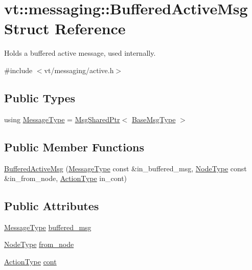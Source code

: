 \hypertarget{structvt_1_1messaging_1_1_buffered_active_msg}{}\section{vt\+:\+:messaging\+:\+:Buffered\+Active\+Msg Struct Reference}
\label{structvt_1_1messaging_1_1_buffered_active_msg}


Holds a buffered active message, used internally.  




{\ttfamily \#include $<$vt/messaging/active.\+h$>$}

\subsection*{Public Types}
\begin{DoxyCompactItemize}
\item 
using \hyperlink{structvt_1_1messaging_1_1_buffered_active_msg_a36c6d58d477907e916a251fb358f9154}{Message\+Type} = \hyperlink{structvt_1_1messaging_1_1_msg_shared_ptr}{Msg\+Shared\+Ptr}$<$ \hyperlink{namespacevt_a44d0d4e144748f2b19a1cfd962f50338}{Base\+Msg\+Type} $>$
\end{DoxyCompactItemize}
\subsection*{Public Member Functions}
\begin{DoxyCompactItemize}
\item 
\hyperlink{structvt_1_1messaging_1_1_buffered_active_msg_a76b964a87805d59f20d0cbf861f546a2}{Buffered\+Active\+Msg} (\hyperlink{structvt_1_1messaging_1_1_buffered_active_msg_a36c6d58d477907e916a251fb358f9154}{Message\+Type} const \&in\+\_\+buffered\+\_\+msg, \hyperlink{namespacevt_a866da9d0efc19c0a1ce79e9e492f47e2}{Node\+Type} const \&in\+\_\+from\+\_\+node, \hyperlink{namespacevt_ae0a5a7b18cc99d7b732cb4d44f46b0f3}{Action\+Type} in\+\_\+cont)
\end{DoxyCompactItemize}
\subsection*{Public Attributes}
\begin{DoxyCompactItemize}
\item 
\hyperlink{structvt_1_1messaging_1_1_buffered_active_msg_a36c6d58d477907e916a251fb358f9154}{Message\+Type} \hyperlink{structvt_1_1messaging_1_1_buffered_active_msg_a88906175db478caa759a279ba6c43bea}{buffered\+\_\+msg}
\item 
\hyperlink{namespacevt_a866da9d0efc19c0a1ce79e9e492f47e2}{Node\+Type} \hyperlink{structvt_1_1messaging_1_1_buffered_active_msg_a54ea3b62b0e7f9ec65d866c7afc82770}{from\+\_\+node}
\item 
\hyperlink{namespacevt_ae0a5a7b18cc99d7b732cb4d44f46b0f3}{Action\+Type} \hyperlink{structvt_1_1messaging_1_1_buffered_active_msg_aced58d5a05c15a2e6eeca7b72bd45e47}{cont}
\end{DoxyCompactItemize}


